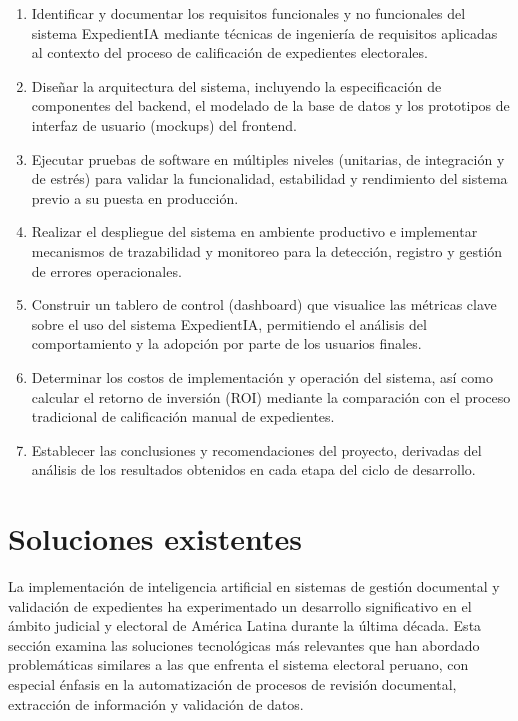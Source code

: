 \documentclass[12pt,a4paper,oneside]{book}
\begin{document}
\begin{enumerate}
    \item Identificar y documentar los requisitos funcionales y no funcionales del sistema ExpedientIA mediante técnicas de ingeniería de requisitos aplicadas al contexto del proceso de calificación de expedientes electorales.

    \item Diseñar la arquitectura del sistema, incluyendo la especificación de componentes del backend, el modelado de la base de datos y los prototipos de interfaz de usuario (mockups) del frontend.

    \item Ejecutar pruebas de software en múltiples niveles (unitarias, de integración y de estrés) para validar la funcionalidad, estabilidad y rendimiento del sistema previo a su puesta en producción.

    \item Realizar el despliegue del sistema en ambiente productivo e implementar mecanismos de trazabilidad y monitoreo para la detección, registro y gestión de errores operacionales.

    \item Construir un tablero de control (dashboard) que visualice las métricas clave sobre el uso del sistema ExpedientIA, permitiendo el análisis del comportamiento y la adopción por parte de los usuarios finales.

    \item Determinar los costos de implementación y operación del sistema, así como calcular el retorno de inversión (ROI) mediante la comparación con el proceso tradicional de calificación manual de expedientes.

    \item Establecer las conclusiones y recomendaciones del proyecto, derivadas del análisis de los resultados obtenidos en cada etapa del ciclo de desarrollo.
\end{enumerate}

\section{Soluciones existentes}
\label{sec:soluciones-existentes}

La implementación de inteligencia artificial en sistemas de gestión documental y validación de expedientes ha experimentado un desarrollo significativo en el ámbito judicial y electoral de América Latina durante la última década. Esta sección examina las soluciones tecnológicas más relevantes que han abordado problemáticas similares a las que enfrenta el sistema electoral peruano, con especial énfasis en la automatización de procesos de revisión documental, extracción de información y validación de datos.
\end{document}
